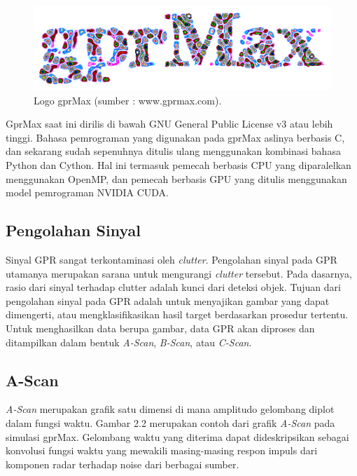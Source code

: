 \begin{figure}[ht]
  \centering
  \includegraphics[scale=0.35]{gambar/gprMax.png}
  \caption{Logo gprMax (sumber : www.gprmax.com).}
  \label{fig:logogprMax}
\end{figure}

GprMax saat ini dirilis di bawah GNU General Public License v3 atau lebih tinggi. 
Bahasa pemrograman yang digunakan pada gprMax aslinya berbasis C, dan sekarang sudah sepenuhnya ditulis ulang menggunakan kombinasi bahasa Python dan Cython. 
Hal ini termasuk pemecah berbasis CPU yang diparalelkan menggunakan OpenMP, dan pemecah berbasis GPU yang ditulis menggunakan model pemrograman NVIDIA CUDA. \parencite{gprMax}

\subsection{Pengolahan Sinyal}
\label{subsec:pengolahanSinyal}

Sinyal GPR sangat terkontaminasi oleh \emph{clutter}. 
Pengolahan sinyal pada GPR utamanya merupakan sarana untuk mengurangi \emph{clutter} tersebut. 
Pada dasarnya, rasio dari sinyal terhadap clutter adalah kunci dari deteksi objek. 
Tujuan dari pengolahan sinyal pada GPR adalah untuk menyajikan gambar yang dapat dimengerti, atau mengklasifikasikan hasil target berdasarkan prosedur tertentu. 
Untuk menghasilkan data berupa gambar, data GPR akan diproses dan ditampilkan dalam bentuk \emph{A-Scan}, \emph{B-Scan}, atau \emph{C-Scan}. \parencite{3DgprMax}

\subsection{A-Scan}
\label{subsec:aScan}

\emph{A-Scan} merupakan grafik satu dimensi di mana amplitudo gelombang diplot dalam fungsi waktu. 
Gambar 2.2 merupakan contoh dari grafik \emph{A-Scan} pada simulasi gprMax. 
Gelombang waktu yang diterima dapat dideskripsikan sebagai konvolusi fungsi waktu yang mewakili masing-masing respon impuls dari komponen radar terhadap noise dari berbagai sumber. 

